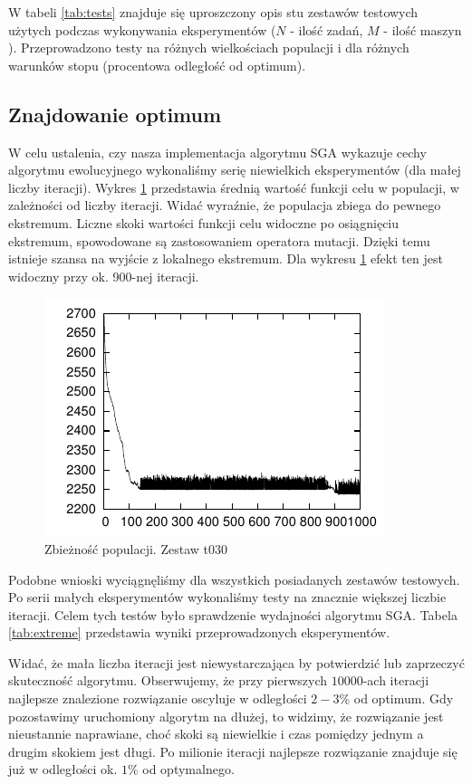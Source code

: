 \documentclass[12pt]{article}
\begin{document}
W tabeli \ref{tab:tests} znajduje się uproszczony opis stu zestawów testowych użytych
podczas wykonywania eksperymentów ($N$ - ilość zadań, $M$ - ilość maszyn ). Przeprowadzono testy na różnych wielkościach populacji i dla różnych warunków stopu
(procentowa odległość od optimum).

\subsection{Znajdowanie optimum}

W celu ustalenia, czy nasza implementacja algorytmu SGA wykazuje cechy algorytmu ewolucyjnego wykonaliśmy serię niewielkich eksperymentów (dla małej liczby iteracji).
Wykres \ref{pic:plot1} przedstawia średnią wartość funkcji celu w populacji, w zależności od liczby iteracji. Widać wyraźnie, że populacja zbiega do pewnego ekstremum.
Liczne skoki wartości funkcji celu widoczne po osiągnięciu ekstremum, spowodowane są zastosowaniem operatora mutacji. Dzięki temu istnieje szansa na wyjście z lokalnego ekstremum.
Dla wykresu \ref{pic:plot1} efekt ten jest widoczny przy ok. 900-nej iteracji. 

\begin{figure}
  \centering
  \includegraphics[scale=1.5]{plots/plot1.pdf}
  \caption{Zbieżność populacji. Zestaw t030}
  \label{pic:plot1}
\end{figure}

Podobne wnioski wyciągnęliśmy dla wszystkich posiadanych zestawów testowych. Po serii małych eksperymentów wykonaliśmy testy na znacznie większej liczbie iteracji.
Celem tych testów było sprawdzenie wydajności algorytmu SGA. Tabela \ref{tab:extreme} przedstawia wyniki przeprowadzonych eksperymentów.

Widać, że mała liczba iteracji jest niewystarczająca by potwierdzić lub zaprzeczyć skuteczność algorytmu. Obserwujemy, że przy pierwszych $10000$-ach
iteracji najlepsze znalezione rozwiązanie oscyluje w odległości $2-3\%$ od optimum. Gdy pozostawimy uruchomiony algorytm na dłużej, to
widzimy, że rozwiązanie jest nieustannie naprawiane, choć skoki są niewielkie i czas pomiędzy jednym a drugim skokiem jest długi. Po milionie iteracji
najlepsze rozwiązanie znajduje się już w odległości ok. $1\%$ od optymalnego.
\end{document}
